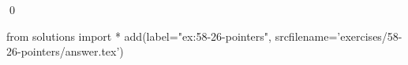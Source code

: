 
\begin{ex}
  \label{ex:58-26-pointers}
  
  \qed
\end{ex}
\begin{python0}
from solutions import *
add(label="ex:58-26-pointers",
    srcfilename='exercises/58-26-pointers/answer.tex')
\end{python0}
